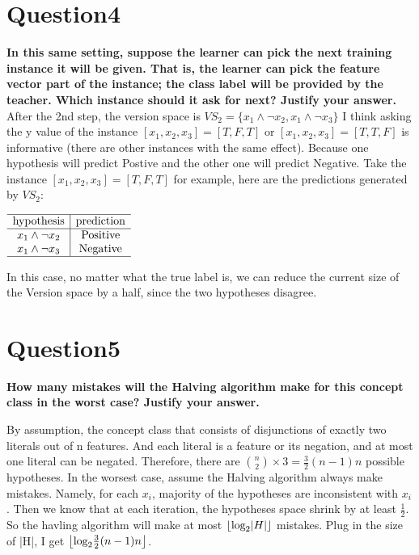 \documentclass[paper=a4, fontsize=11pt]{scrartcl} %
\DeclarePairedDelimiter\floor{\lfloor}{\rfloor}
\numberwithin{equation}{section} %
\numberwithin{figure}{section} %
\numberwithin{table}{section} %
\begin{document}
\newpage
\section*{Question4}
\textbf{In this same setting, suppose the learner can pick the next training instance it will be given. That is, the learner can pick the feature vector part of the instance; the class label will be provided by the teacher. Which instance should it ask for next? Justify your answer.}
\bigbreak 
After the 2nd step, the version space is $VS_2 = 
\{
x_1 \land \neg x_2, x_1 \land \neg x_3
\}$
\smallbreak
I think asking the y value of the instance $[x_1,x_2,x_3] = [T,F,T]$ or $[x_1,x_2,x_3] = [T,T,F]$ is informative (there are other instances with the same effect). Because one hypothesis will predict Postive and the other one will predict Negative. 
\bigbreak
Take the instance $[x_1,x_2,x_3] = [T,F,T]$ for example, here are the predictions generated by $VS_2$: 

\begin{center}
$
\begin{array}{c|c}
\hline
\text{hypothesis} & \text{prediction} \\
\hline
x_1 \land \neg x_2 & \text{Positive} \\ 
x_1 \land \neg x_3 & \text{Negative} \\ 
\hline
\end{array}
$
\end{center}

In this case, no matter what the true label is, we can reduce the current size of the Version space by a half, since the two hypotheses disagree.  

\newpage
\section*{Question5}
\textbf{How many mistakes will the Halving algorithm make for this concept class in the worst case? Justify your answer.}
\bigbreak 


By assumption, the concept class that consists of disjunctions of exactly two literals out of n features. And each literal is a feature or its negation, and at most one literal can be negated. Therefore, there are 
$
{{n}\choose{2}} \times 3 = \frac{3}{2}(n-1)n
$
possible hypotheses. 
\smallbreak
In the worsest case, assume the Halving algorithm always make mistakes. Namely, for each $x_i$, majority of the hypotheses are inconsistent with $x_i$. Then we know that at each iteration, the hypotheses space shrink by at least $\frac{1}{2}$. So the havling algorithm will make at most  $\floor*{\text{log}_2 |H|}$ mistakes. Plug in the size of |H|, I get $\floor*{\text{log}_2 \frac{3}{2}(n-1)n}$. 
\bigbreak
\end{document}
